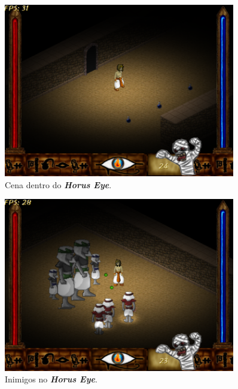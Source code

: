 \documentclass[12pt,onecolumn,a4paper]{article}
\begin{document}
        \begin{figure}[htb]
            \centering
            \includegraphics[width=0.9\textwidth]{images/horus_03.png}
            \caption{Cena dentro do \textit{\textbf{Horus Eye}}.}
            \label{fig:horus_03}
        \end{figure}
        
        \begin{figure}[htb]
            \centering
            \includegraphics[width=0.9\textwidth]{images/horus_04.png}
            \caption{Inimigos no \textit{\textbf{Horus Eye}}.}
            \label{fig:horus_04}
        \end{figure}
        
\end{document}
